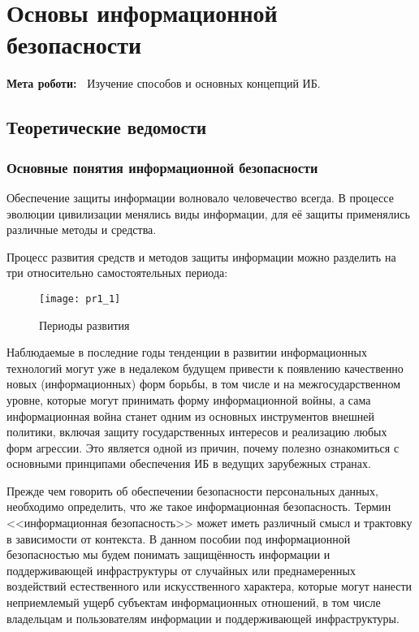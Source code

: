 \chapter{Основы информационной безопасности} \label{chapt1}%
\textbf{Мета роботи:~}%
Изучение способов и основных концепций ИБ.
\section{Теоретические ведомости} \label{sect1_a}
%
\subsection{Основные понятия информационной безопасности}

Обеспечение защиты информации волновало человечество всегда. В процессе
эволюции цивилизации менялись виды информации, для её защиты применялись
различные методы и средства.

Процесс развития средств и методов защиты информации можно разделить на три
относительно самостоятельных периода:
\begin{figure}[ht]
  \centering
  \texttt{[image: pr1\_1]}
  \caption{Периоды развития}\label{pr1_1}
\end{figure}

Наблюдаемые в последние годы тенденции в развитии информационных технологий
могут уже в недалеком будущем привести к появлению качественно новых
(информационных) форм борьбы, в том числе и на межгосударственном уровне,
которые могут принимать форму информационной войны, а сама информационная
война станет одним из основных инструментов внешней политики, включая защиту
государственных интересов и реализацию любых форм агрессии. Это является
одной из причин, почему полезно ознакомиться с основными принципами
обеспечения ИБ в ведущих зарубежных странах.

Прежде чем говорить об обеспечении безопасности персональных данных,
необходимо определить, что же такое информационная безопасность. Термин
<<информационная безопасность>> может иметь различный смысл и трактовку в
зависимости от контекста. В данном пособии под информационной безопасностью
мы будем понимать защищённость информации и поддерживающей инфраструктуры от
случайных или преднамеренных воздействий естественного или искусственного
характера, которые могут нанести неприемлемый ущерб субъектам информационных
отношений, в том числе владельцам и пользователям информации и поддерживающей
инфраструктуры.\href{https://www.intuit.ru/studies/courses/697/553/literature#literature.1}{\todo{[1]}}

